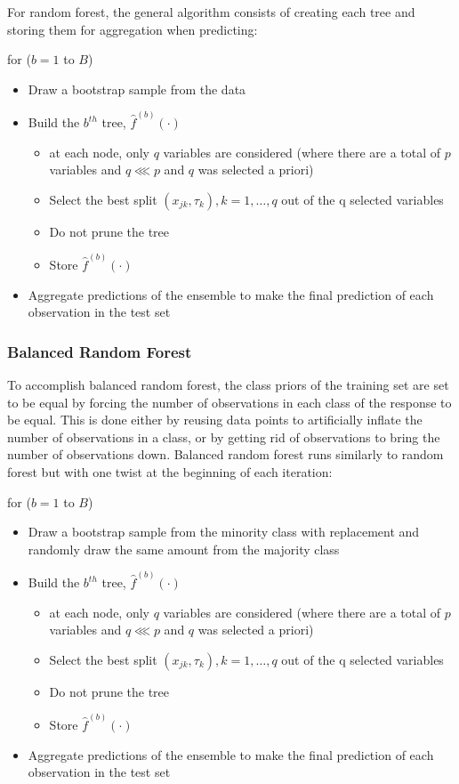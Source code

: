 \documentclass[a4paper]{article}
\begin{document}
For random forest, the general algorithm consists of creating each tree and storing them for aggregation when predicting:

for ($b=1$ to $B$)
\begin{itemize}
\item Draw a bootstrap sample from the data
\item Build the $b^{th}$ tree, $\hat{f}^{(b)}(\cdot)$
\begin{itemize}
\item at each node, only $q$ variables are considered (where there are a total of $p$ variables and $q\lll p$ and $q$ was selected a priori)
\item Select the best split $(x_{jk},\tau_k), k=1,\dots,q$ out of the q selected variables
\item Do not prune the tree
\item Store  $\hat{f}^{(b)}(\cdot)$
\end{itemize}
\item Aggregate predictions of the ensemble to make the final prediction of each observation in the test set
\end{itemize}

\subsubsection{Balanced Random Forest}

To accomplish balanced random forest, the class priors of the training set are set to be equal by forcing the number of observations in each class of the response to be equal. This is done either by reusing data points to artificially inflate the number of observations in a class, or by getting rid of observations to bring the number of observations down. Balanced random forest runs similarly to random forest but with one twist at the beginning of each iteration:

for ($b=1$ to $B$)
\begin{itemize}
\item Draw a bootstrap sample from the minority class with replacement and randomly draw the same amount from the majority class
\item Build the $b^{th}$ tree, $\hat{f}^{(b)}(\cdot)$
\begin{itemize}
\item at each node, only $q$ variables are considered (where there are a total of $p$ variables and $q\lll p$ and $q$ was selected a priori)
\item Select the best split $(x_{jk},\tau_k), k=1,\dots,q$ out of the q selected variables
\item Do not prune the tree
\item Store  $\hat{f}^{(b)}(\cdot)$
\end{itemize}
\item Aggregate predictions of the ensemble to make the final prediction of each observation in the test set
\end{itemize}
\end{document}
